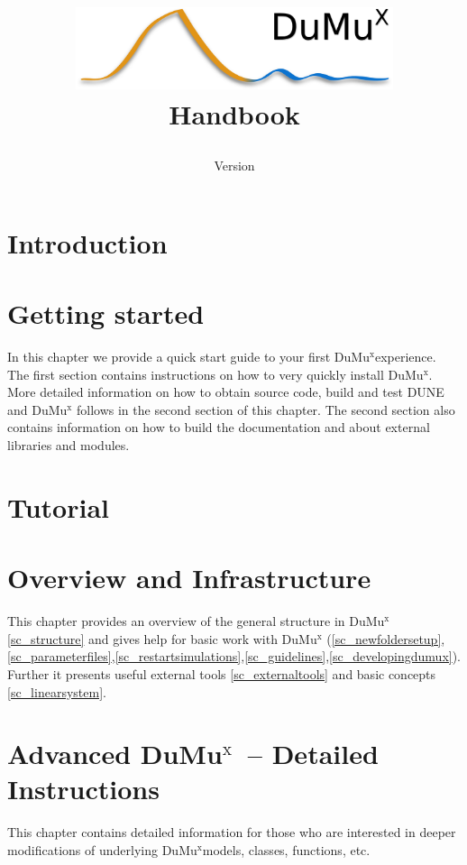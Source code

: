 \documentclass[11pt,a4paper,headinclude,footinclude,DIV16]{scrreprt}
\title{
\begin{center}
\includegraphics[width=0.7\textwidth]{../logo/dumux_logo_hires_whitebg.png}
\\[3cm]
{\Huge Handbook}
\end{center}
}
\author{}
\date{Version \DumuxVersion}
\newcommand{\Dune}{{DUNE}\xspace}
\newcommand{\Dumux}{\texorpdfstring{Du\-Mu$^\text{x}$\xspace}{DuMuX\xspace}}
\begin{document}
\maketitle

\setcounter{tocdepth}{1}
\tableofcontents
\newpage

\chapter{Introduction}


\chapter{Getting started}
In this chapter we provide a quick start guide to
your first \Dumux experience.
The first section contains instructions on how to very quickly install \Dumux.
More detailed information on how to obtain source code, build and test \Dune and \Dumux
follows in the second section of this chapter. The second section also contains information on
how to build the documentation and about external libraries and modules.



\chapter{Tutorial}\label{chp:tutorial}



\chapter{Overview and Infrastructure}
This chapter provides an overview of the general structure in \Dumux \ref{sc_structure}
and gives help for basic work with \Dumux
(\ref{sc_newfoldersetup},\ref{sc_parameterfiles},\ref{sc_restartsimulations},\ref{sc_guidelines},\ref{sc_developingdumux}).
Further it presents useful external tools \ref{sc_externaltools} and basic
concepts \ref{sc_linearsystem}.









\chapter{Advanced \Dumux\ -- Detailed Instructions}
This chapter contains detailed information for those who are interested
in deeper modifications of underlying \Dumux models, classes, functions, etc.








\printindex
\end{document}
